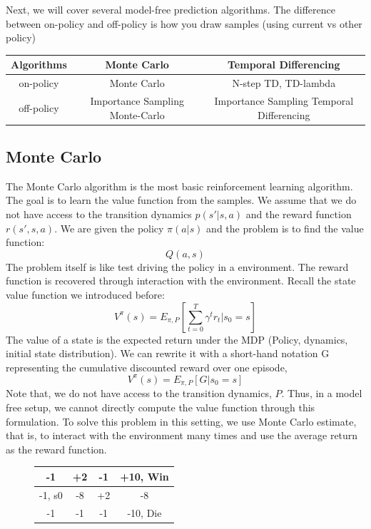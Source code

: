 \documentclass[11pt]{article}
\begin{document}
Next, we will cover several model-free prediction algorithms. The difference between on-policy and off-policy is how you draw samples (using current vs other policy)
\begin{center}
\begin{tabular}{ |c|c|c| }
 \hline
 Algorithms & Monte Carlo & Temporal Differencing \\
 \hline\hline
 on-policy & Monte Carlo & N-step TD, TD-lambda \\  
 \hline
 off-policy & Importance Sampling Monte-Carlo & Importance Sampling
Temporal Differencing \\
 \hline
\end{tabular}
\end{center}

\subsection{Monte Carlo}
The Monte Carlo algorithm is the most basic reinforcement learning algorithm. The goal is to learn the value function from the samples. We assume that we do not have access to the transition dynamics \(p(s' | s, a)\) and the reward function \(r(s', s, a)\). We are given the policy \(\pi(a|s)\) and the problem is to find the value function:
\[Q(a, s)\]
The problem itself is like test driving the policy in a environment. The reward function is recovered through interaction with the environment. Recall the state value function we introduced before:
\begin{equation}
V^{\pi}(s) = E_{\pi, P} [\sum_{t=0}^T \gamma^t r_t | s_0=s]
\end{equation}
The value of a state is the expected return under the MDP (Policy, dynamics, initial state distribution). We can rewrite it with a short-hand notation G representing the cumulative discounted reward over one episode, 
\begin{equation}
V^{\pi}(s) = E_{\pi, P} [G | s_0=s]
\end{equation}
Note that, we do not have access to the transition dynamics, \(P\). Thus, in a model free setup, we cannot directly compute the value function through this formulation. To solve this problem in this setting, we use Monte Carlo estimate, that is, to interact with the environment many times and use the average return as the reward function.
\begin{figure}[h]
\centering
\begin{tabular}{| c | c | c | c |}
\hline
-1 & +2 & -1 & +10, Win \\
\hline
-1, s0 & -8 & +2 & -8 \\
\hline
-1 & -1 & -1 & -10, Die \\
\hline
\end{tabular}
\end{figure}
\end{document}
